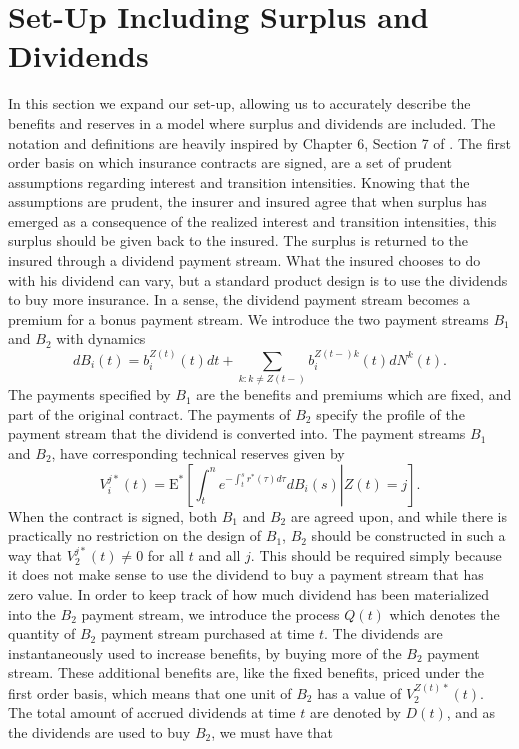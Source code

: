 \documentclass[12pt]{article}
\newcommand{\E}{\text{E}}
\theoremstyle{my_thm}
\begin{document}
\section{Set-Up Including Surplus and Dividends} \label{sec:Set_2}
In this section we expand our set-up, allowing us to accurately describe the benefits and reserves in a model where surplus and dividends are included. The notation and definitions are heavily inspired by Chapter 6, Section 7 of \citet{RaI}. The first order basis on which insurance contracts are signed, are a set of prudent assumptions regarding interest and transition intensities. Knowing that the assumptions are prudent, the insurer and insured agree that when surplus has emerged as a consequence of the realized interest and transition intensities, this surplus should be given back to the insured. The surplus is returned to the insured through a dividend payment stream. What the insured chooses to do with his dividend can vary, but a standard product design is to use the dividends to buy more insurance. In a sense, the dividend payment stream becomes a premium for a bonus payment stream. We introduce the two payment streams $B_1$ and $B_2$ with dynamics
$$
dB_i(t)=b_i^{Z(t)}(t) dt +\sum_{k:k \neq Z(t-)} b_i^{Z(t-)k}(t)dN^k(t).
$$
The payments specified by $B_1$ are the benefits and premiums which are fixed, and part of the original contract. The payments of $B_2$ specify the profile of the payment stream that the dividend is converted into. The payment streams $B_1$ and $B_2$, have corresponding technical reserves given by
$$
V_i^{j*}(t)=\E^* \left. \left[ \int_t^n e^{-\int_t^s r^*(\tau) d\tau} dB_i(s) \right| Z(t)=j \right].
$$
When the contract is signed, both $B_1$ and $B_2$ are agreed upon, and while there is practically no restriction on the design of $B_1$, $B_2$ should be constructed in such a way that $V_2^{j*}(t)\neq 0$ for all $t$ and all $j$. This should be required simply because it does not make sense to use the dividend to buy a payment stream that has zero value. In order to keep track of how much dividend has been materialized into the $B_2$ payment stream, we introduce the process $Q(t)$ which denotes the quantity of $B_2$ payment stream purchased at time $t$. The dividends are instantaneously used to increase benefits, by buying more of the $B_2$ payment stream. These additional benefits are, like the fixed benefits, priced under the first order basis, which means that one unit of $B_2$ has a value of $V_2^{Z(t)*}(t)$. The total amount of accrued dividends at time $t$ are denoted by $D(t)$, and as the dividends are used to buy $B_2$, we must have that
\end{document}
